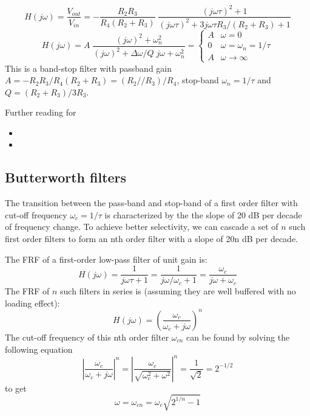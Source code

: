 \documentclass{article}
\begin{document}
\begin{equation}
H(j\omega)=\frac{V_{out}}{V_{in}}
=-\frac{R_2R_3}{R_4(R_2+R_3)}\;\frac{(j\omega\tau)^2+1}{(j\omega\tau)^2+3j\omega\tau R_3/(R_2+R_3)+1}
\end{equation}
\begin{equation}
H(j\omega)=A\;\frac{(j\omega)^2+\omega_n^2}{(j\omega)^2+\Delta\omega/Q\;j\omega+\omega_n^2}
=\left\{\begin{array}{ll}A&\omega=0\\0&\omega=\omega_n=1/\tau
\\A&\omega\rightarrow\infty\end{array}\right.
\end{equation}
This is a band-stop filter with passband gain $A=-R_2R_3/R_4(R_2+R_3)=(R_2//R_3)/R_4$,
stop-band $\omega_n=1/\tau$ and $Q=(R_2+R_3)/3R_3$.


Further reading for 
\begin{itemize}
\item {}
\item {}
\end{itemize}



\subsection{Butterworth filters}

  The transition between the pass-band and stop-band of a first order 
  filter with cut-off frequency $\omega_c=1/\tau$ is characterized by the 
  the slope of 20 dB per decade of frequency change. To achieve better 
  selectivity, we can cascade a set of $n$ such first order filters to
  form an nth order filter with a slope of 20n dB per decade.


  The FRF of a first-order low-pass filter of unit gain is:  
  \begin{equation}
  H(j\omega)=\frac{1}{j\omega\tau+1}
  =\frac{1}{j\omega/\omega_c+1}=\frac{\omega_c}{j\omega+\omega_c}
  \end{equation}
  The FRF of $n$ such filters in series is (assuming they are well
  buffered with no loading effect):
  \begin{equation}
  H(j\omega)=\left(\frac{\omega_c}{\omega_c+j\omega} \right)^n
  \end{equation}
  The cut-off frequency of this nth order filter $\omega_{cn}$ can be
  found by solving the following equation
  \begin{equation}
  \left|\frac{\omega_c}{\omega_c+j\omega}\right|^n
  =\left|\frac{\omega_c}{\sqrt{\omega_c^2+\omega^2}}\right|^n
  =\frac{1}{\sqrt{2}}=2^{-1/2}
  \end{equation}
  to get
  \begin{equation}
  \omega=\omega_{cn}=\omega_c\sqrt{2^{1/n}-1}
  \end{equation}
\end{document}
